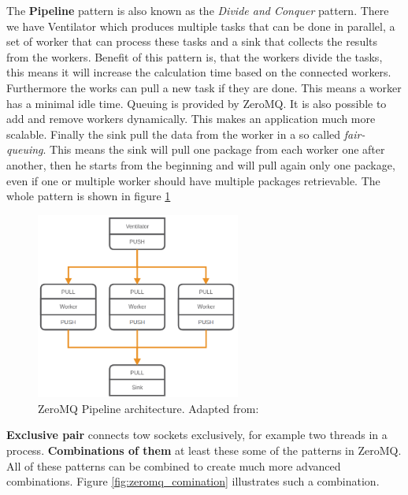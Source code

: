 The \textbf{Pipeline} pattern is also known as the \textit{Divide and Conquer} pattern.
There we have Ventilator which produces multiple tasks that can be done in parallel, a set of worker that can process these tasks and a sink that collects the results from the workers.\autocite{ZeroMQ:Guide}
Benefit of this pattern is, that the workers divide the tasks, this means it will increase the calculation time based on the connected workers.
Furthermore the works can pull a new task if they are done.
This means a worker has a minimal idle time.
Queuing is provided by ZeroMQ.
It is also possible to add and remove workers dynamically.
This makes an application much more scalable.
Finally the sink pull the data from the worker in a so called \textit{fair-queuing}.
This means the sink will pull one package from each worker one after another, then he starts from the beginning and will pull again only one package, even if one or multiple worker should have multiple packages retrievable.
The whole pattern is shown in figure \ref{fig:zeromq_pipeline}\newline
\begin{figure}[H]
    \centering
    \includegraphics[width=0.6\textwidth]{resources/images/zeromq-vernitlator.png}
    \caption[ZeroMQ Pipeline architecture]{ZeroMQ Pipeline architecture. Adapted from: \autocite{ZeroMQ:Guide}}
    \label{fig:zeromq_pipeline}
\end{figure}
\textbf{Exclusive pair} connects tow sockets exclusively, for example two threads in a process.\autocite{ZeroMQ:Guide}
\newline
\textbf{Combinations of them} at least these some of the patterns in ZeroMQ.
All of these patterns can be combined to create much more advanced combinations.
Figure \ref{fig:zeromq_comination} illustrates such a combination.
